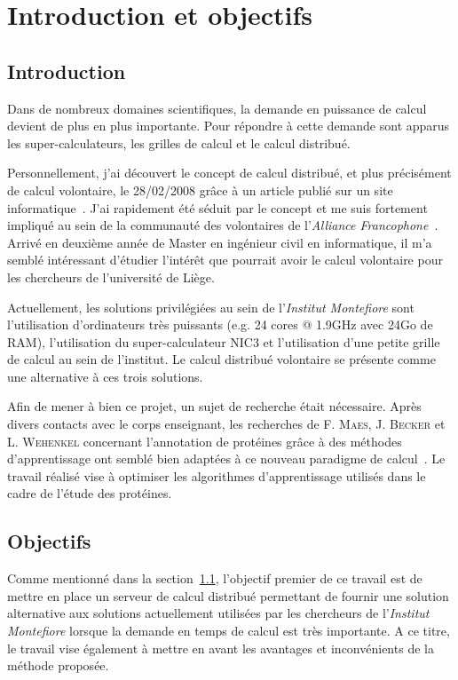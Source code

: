 \documentclass[a4paper, 12pt]{report}
\begin{document}
\newpage

\dominitoc
\tableofcontents
\listoffigures
\listoftables
\newpage

\chapter{Introduction et objectifs}
\minitoc
\section{Introduction}
\label{intro}
Dans de nombreux domaines scientifiques, la demande en puissance de calcul devient de plus en plus importante. Pour répondre à cette demande sont apparus les super-calculateurs, les grilles de calcul et le calcul distribué.

Personnellement, j'ai découvert le concept de calcul distribué, et plus précisément de calcul volontaire, le 28/02/2008 grâce à un article publié sur un site informatique~\cite{MACG}. J'ai rapidement été séduit par le concept et me suis fortement impliqué au sein de la communauté des volontaires de l'\textit{Alliance Francophone}~\cite{AF}. Arrivé en deuxième année de Master en ingénieur civil en informatique, il m'a semblé intéressant d'étudier l'intérêt que pourrait avoir le calcul volontaire pour les chercheurs de l'université de Liège. 

Actuellement, les solutions privilégiées au sein de l'\textit{Institut Montefiore} sont l'utilisation d'ordinateurs très puissants (e.g. 24 cores @ 1.9GHz avec 24Go de RAM), l'utilisation du super-calculateur NIC3 et l'utilisation d'une petite grille de calcul au sein de l'institut. Le calcul distribué volontaire se présente comme une alternative à ces trois solutions.

Afin de mener à bien ce projet, un sujet de recherche était nécessaire. Après divers contacts avec le corps enseignant, les recherches de F. \textsc{Maes}, J. \textsc{Becker} et L. \textsc{Wehenkel} concernant l'annotation de protéines grâce à des méthodes d'apprentissage ont semblé bien adaptées à ce nouveau paradigme de calcul~\cite{CAP}. Le travail réalisé vise à optimiser les algorithmes d'apprentissage utilisés dans le cadre de l'étude des protéines.

\section{Objectifs}
\label{objectifs}
Comme mentionné dans la section~\ref{intro}, l'objectif premier de ce travail est de mettre en place un serveur de calcul distribué permettant de fournir une solution alternative aux solutions actuellement utilisées par les chercheurs de l'\textit{Institut Montefiore} lorsque la demande en temps de calcul est très importante. A ce titre, le travail vise également à mettre en avant les avantages et inconvénients de la méthode proposée.
\end{document}
